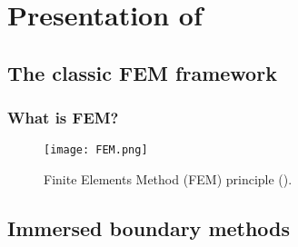 

\section{Presentation of \phifem}

\subsection{The classic FEM framework}
\begin{frame}
    \frametitle{What is FEM?}

    \begin{figure}
        \centering
        \texttt{[image: FEM.png]}
        \caption{Finite Elements Method (FEM) principle (\cite{cyclopedia}).}
    \end{figure}

\end{frame}



\subsection{Immersed boundary methods}


